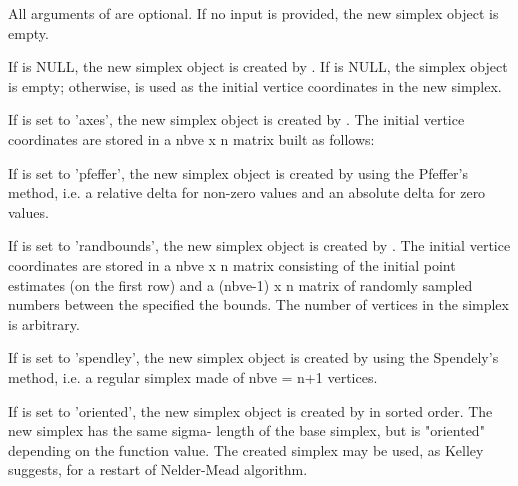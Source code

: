 %
\begin{Details}\relax
All arguments of  are optional. If no input is provided,
the new simplex object is empty.

If  is NULL, the new simplex object is created by
. If  is NULL, the simplex object is
empty; otherwise,  is used as the initial vertice coordinates
in the new simplex.

If  is set to 'axes', the new simplex object is created by
. The initial vertice coordinates are stored in a nbve
x n matrix built as follows:

If  is set to 'pfeffer', the new simplex object is created by
 using the Pfeffer's method, i.e. a relative delta
for non-zero values and an absolute delta for zero values.

If  is set to 'randbounds', the new simplex object is created by
. The initial vertice coordinates are stored in
a nbve x n matrix consisting of the initial point estimates (on the first
row) and a (nbve-1) x n matrix of randomly sampled numbers between the
specified the bounds. The number of vertices  in the simplex is
arbitrary.

If  is set to 'spendley', the new simplex object is created by
 using the Spendely's method, i.e. a regular
simplex made of nbve = n+1 vertices. 

If  is set to 'oriented', the new simplex object is created by
 in sorted order. The new simplex has the same
sigma- length of the base simplex, but is "oriented" depending on the function
value. The created simplex may be used, as Kelley suggests, for a restart of
Nelder-Mead algorithm.
\end{Details}
%
